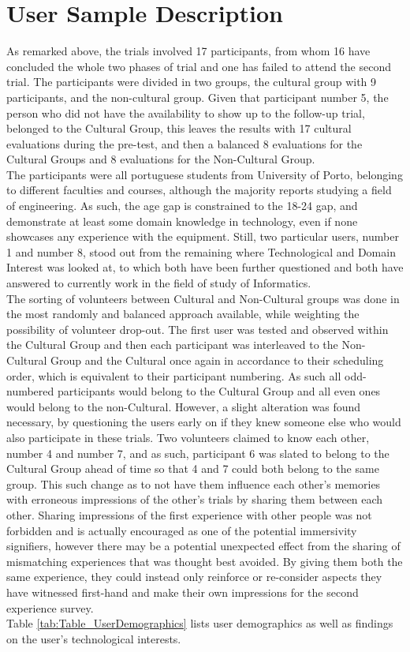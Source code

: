 \section{User Sample Description} \label{sec:results_section}
    As remarked above, the trials involved 17 participants, from whom 16 have concluded the whole two phases of trial and one has failed to attend the second trial. The participants were divided in two groups, the cultural group with 9 participants, and the non-cultural group. Given that participant number 5, the person who did not have the availability to show up to the follow-up trial, belonged to the Cultural Group, this leaves the results with 17 cultural evaluations during the pre-test, and then a balanced 8 evaluations for the Cultural Groups and 8 evaluations for the Non-Cultural Group.\\
    The participants were all portuguese students from University of Porto, belonging to different faculties and courses, although the majority reports studying a field of engineering. As such, the age gap is constrained to the 18-24 gap, and demonstrate at least some domain knowledge in technology, even if none showcases any experience with the equipment. Still, two particular users, number 1 and number 8, stood out from the remaining where Technological and Domain Interest was looked at, to which both have been further questioned and both have answered to currently work in the field of study of Informatics.\\
    The sorting of volunteers between Cultural and Non-Cultural groups was done in the most randomly and balanced approach available, while weighting the possibility of volunteer drop-out. The first user was tested and observed within the Cultural Group and then each participant was interleaved to the Non-Cultural Group and the Cultural once again in accordance to their scheduling order, which is equivalent to their participant numbering. As such all odd-numbered participants would belong to the Cultural Group and all even ones would belong to the non-Cultural. However, a slight alteration was found necessary, by questioning the users early on if they knew someone else who would also participate in these trials. Two volunteers claimed to know each other, number 4 and number 7, and as such, participant 6 was slated to belong to the Cultural Group ahead of time so that 4 and 7 could both belong to the same group. This such change as to not have them influence each other’s memories with erroneous impressions of the other’s trials by sharing them between each other. Sharing impressions of the first experience with other people was not forbidden and is actually encouraged as one of the potential immersivity signifiers, however there may be a potential unexpected effect from the sharing of mismatching experiences that was thought best avoided. By giving them both the same experience, they could instead only reinforce or re-consider aspects they have witnessed first-hand and make their own impressions for the second experience survey.\\
    Table \ref{tab:Table_UserDemographics} lists user demographics as well as findings on the user’s technological interests.\\

